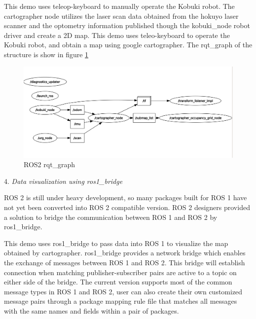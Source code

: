 \documentclass[letterpaper, 10 pt, conference]{ieeeconf}  %
\begin{document}
This demo uses teleop-keyboard to manually operate the Kobuki robot. The cartographer node utilizes the laser scan data obtained from the hokuyo laser scanner and the optometry information published though the kobuki\_node robot driver and create a 2D map. 
This demo uses teleo-keyboard to operate the Kobuki robot, and obtain a map using google cartographer. The rqt\_graph of the structure is show in figure \ref{fig:rqt}\par\vspace{5pt}
\begin{figure}[ht]
  \includegraphics[width=\linewidth]{qrt_graph.png}
  \caption{ROS2 rqt\_graph} 
  \label{fig:rqt}
\end{figure}
4. \textit{Data visualization using ros1\_bridge}\par\vspace{5pt} 
ROS 2 is still under heavy development, so many packages built for ROS 1 have not yet been converted into ROS 2 compatible version. ROS 2 designers provided a solution to bridge the communication between ROS 1 and ROS 2 by ros1\_bridge.  
\par\vspace{5pt} 
This demo uses ros1\_bridge to pass data into ROS 1 to visualize the map obtained by cartographer. ros1\_bridge provides a network bridge which enables the exchange of messages between ROS 1 and ROS 2. This bridge will establish connection when matching publisher-subscriber pairs are active to a topic on either side of the bridge\cite{c4}. The current version supports most of the common message types in ROS 1 and ROS 2, user can also create their own customized message pairs through a package mapping rule file that matches all messages with the same names and fields within a pair of packages.\par\vspace{5pt} 
\end{document}
